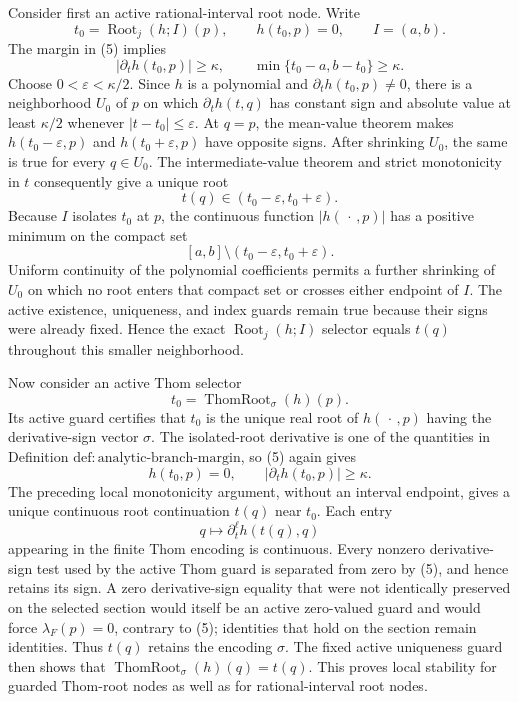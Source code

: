Consider first an active rational-interval root node.  Write
\[
 t_0=\operatorname{Root}_j(h;I)(p),
 \qquad h(t_0,p)=0,
 \qquad I=(a,b).
\]
The margin in (5) implies
\[
 |\partial_t h(t_0,p)|\geq\kappa,
 \qquad
 \min\{t_0-a,b-t_0\}\geq\kappa. \tag{6}
\]
Choose \(0<\varepsilon<\kappa/2\).  Since \(h\) is a polynomial and \(\partial_t h(t_0,p)\neq0\), there is a neighborhood \(U_0\) of \(p\) on which \(\partial_t h(t,q)\) has constant sign and absolute value at least \(\kappa/2\) whenever \(|t-t_0|\leq\varepsilon\).  At \(q=p\), the mean-value theorem makes \(h(t_0-\varepsilon,p)\) and \(h(t_0+\varepsilon,p)\) have opposite signs.  After shrinking \(U_0\), the same is true for every \(q\in U_0\).  The intermediate-value theorem and strict monotonicity in \(t\) consequently give a unique root
\[
 t(q)\in(t_0-\varepsilon,t_0+\varepsilon). \tag{7}
\]
Because \(I\) isolates \(t_0\) at \(p\), the continuous function \(|h(\,·\,,p)|\) has a positive minimum on the compact set
\[
 [a,b]\setminus(t_0-\varepsilon,t_0+\varepsilon).
\]
Uniform continuity of the polynomial coefficients permits a further shrinking of \(U_0\) on which no root enters that compact set or crosses either endpoint of \(I\).  The active existence, uniqueness, and index guards remain true because their signs were already fixed.  Hence the exact \(\operatorname{Root}_j(h;I)\) selector equals \(t(q)\) throughout this smaller neighborhood.

Now consider an active Thom selector
\[
 t_0=\operatorname{ThomRoot}_{\sigma}(h)(p).
\]
Its active guard certifies that \(t_0\) is the unique real root of \(h(\,·\,,p)\) having the derivative-sign vector \(\sigma\).  The isolated-root derivative is one of the quantities in Definition \(\mathrm{def:analytic\text{-}branch\text{-}margin}\), so (5) again gives
\[
 h(t_0,p)=0,
 \qquad |\partial_t h(t_0,p)|\geq\kappa. \tag{8}
\]
The preceding local monotonicity argument, without an interval endpoint, gives a unique continuous root continuation \(t(q)\) near \(t_0\).  Each entry
\[
 q\longmapsto \partial_t^{\ell}h(t(q),q)
\]
appearing in the finite Thom encoding is continuous.  Every nonzero derivative-sign test used by the active Thom guard is separated from zero by (5), and hence retains its sign.  A zero derivative-sign equality that were not identically preserved on the selected section would itself be an active zero-valued guard and would force \(\lambda_F(p)=0\), contrary to (5); identities that hold on the section remain identities.  Thus \(t(q)\) retains the encoding \(\sigma\).  The fixed active uniqueness guard then shows that \(\operatorname{ThomRoot}_{\sigma}(h)(q)=t(q)\).  This proves local stability for guarded Thom-root nodes as well as for rational-interval root nodes.

